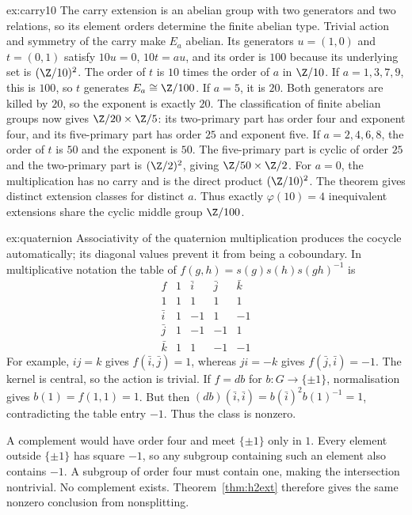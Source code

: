 \begin{solution}{ex:carry10}
\idea The carry extension is an abelian group with two generators and two relations, so its element orders determine the finite abelian type.
\writeup Trivial action and symmetry of the carry make $E_a$ abelian. Its generators $u=(1,0)$ and $t=(0,1)$ satisfy
$10u=0$, $10t=au$, and its order is $100$ because its underlying set is $(\Z/10)^2$. The order of $t$ is $10$ times the order of $a$ in $\Z/10$.
If $a=1,3,7,9$, this is $100$, so $t$ generates $E_a\cong\Z/100$.
If $a=5$, it is $20$. Both generators are killed by $20$, so the exponent is exactly $20$. The classification of finite abelian groups now gives $\Z/20\times\Z/5$: its two-primary part has order four and exponent four, and its five-primary part has order $25$ and exponent five.
If $a=2,4,6,8$, the order of $t$ is $50$ and the exponent is $50$. The five-primary part is cyclic of order $25$ and the two-primary part is $(\Z/2)^2$, giving $\Z/50\times\Z/2$.
For $a=0$, the multiplication has no carry and is the direct product $(\Z/10)^2$.
The theorem gives distinct extension classes for distinct $a$. Thus exactly $\varphi(10)=4$ inequivalent extensions share the cyclic middle group $\Z/100$.
\end{solution}

\begin{solution}{ex:quaternion}
\idea Associativity of the quaternion multiplication produces the cocycle automatically; its diagonal values prevent it from being a coboundary.
\writeup In multiplicative notation the table of
$f(g,h)=s(g)s(h)s(gh)^{-1}$ is
\[
\begin{array}{c|rrrr}
f&1&\bar i&\bar j&\bar k\\\hline
1&1&1&1&1\\
\bar i&1&-1&1&-1\\
\bar j&1&-1&-1&1\\
\bar k&1&1&-1&-1
\end{array}
\]
For example, $ij=k$ gives $f(\bar i,\bar j)=1$, whereas $ji=-k$ gives $f(\bar j,\bar i)=-1$. The kernel is central, so the action is trivial.
If $f=db$ for $b:G\to\{\pm1\}$, normalisation gives $b(1)=f(1,1)=1$. But then
$(db)(\bar i,\bar i)=b(\bar i)^2b(1)^{-1}=1$, contradicting the table entry $-1$. Thus the class is nonzero.

A complement would have order four and meet $\{\pm1\}$ only in $1$. Every element outside $\{\pm1\}$ has square $-1$, so any subgroup containing such an element also contains $-1$. A subgroup of order four must contain one, making the intersection nontrivial. No complement exists. Theorem~\ref{thm:h2ext} therefore gives the same nonzero conclusion from nonsplitting.
\end{solution}

